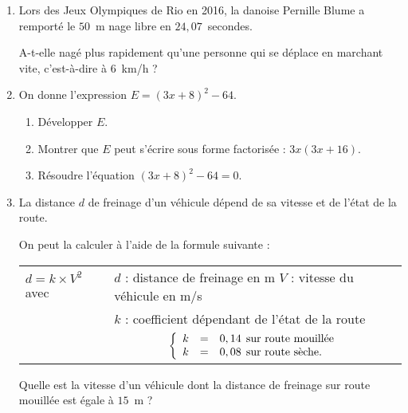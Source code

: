 
\medskip

\begin{enumerate}
\item Lors des Jeux Olympiques de Rio en 2016, la danoise Pernille Blume a remporté le $50$~m nage libre en $24,07$~secondes.

A-t-elle nagé plus rapidement qu'une personne qui se déplace en marchant vite, c'est-à-dire à $6$~km/h ?
\item  On donne l'expression $E = (3x + 8)^2 - 64$.
	\begin{enumerate}
		\item Développer $E$.
		\item  Montrer que $E$ peut s'écrire sous forme factorisée : $3x(3x + 16)$.
		\item  Résoudre l'équation $(3x + 8)^2 - 64 = 0$.
	\end{enumerate}
\item  La distance $d$ de freinage d'un véhicule dépend de sa vitesse et de l'état de la route.
	
On peut la calculer à l'aide de la formule suivante :
	
\begin{tabularx}{\linewidth}{m{2.3cm} X}
$d = k \times  V^2$ avec 	&$d$ : distance de freinage en m \: $V$ : vitesse du véhicule en m/s\\
							&$k$ : coefficient dépendant de l'état de la route\\
							&\multicolumn{1}{c}{$\left\{\begin{array}{l c l}
k &=& 0,14 \:\:\text{sur route mouillée}\\
k &=& 0,08 \:\:\text{sur route sèche.}
\end{array}\right.$}\\
\end{tabularx}

Quelle est la vitesse d'un véhicule dont la distance de freinage sur route mouillée est égale à $15$~m ?
\end{enumerate}

\vspace{0,5cm}

